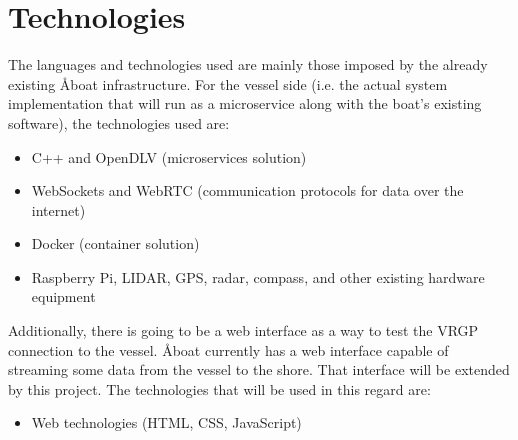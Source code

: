 \section{Technologies}\label{sec:technologies}

The languages and technologies used are mainly those imposed by the already existing Åboat infrastructure. For the vessel side (i.e. the actual system implementation that will run as a microservice along with the boat’s existing software), the technologies used are:

\begin{itemize}
	\item C++ and OpenDLV (microservices solution)
	\item WebSockets and WebRTC (communication protocols for data over the internet)
	\item Docker (container solution)
	\item Raspberry Pi, LIDAR, GPS, radar, compass, and other existing hardware equipment
\end{itemize}

Additionally, there is going to be a web interface as a way to test the VRGP connection to the vessel. Åboat currently has a web interface capable of streaming some data from the vessel to the shore. That interface will be extended by this project. The technologies that will be used in this regard are:

\begin{itemize}
	\item Web technologies (HTML, CSS, JavaScript)
\end{itemize}
